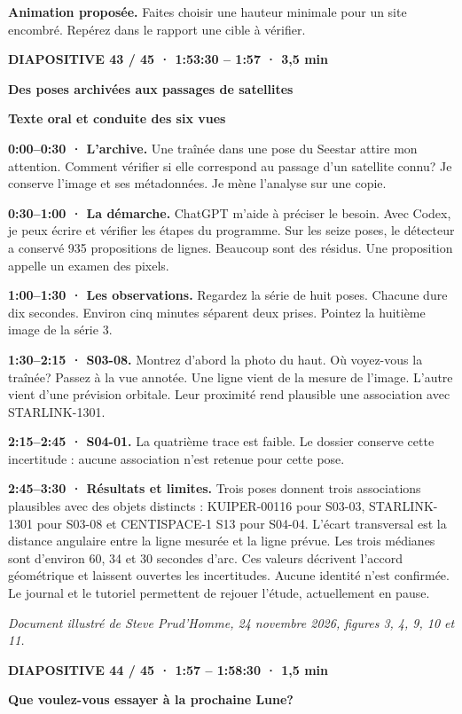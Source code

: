 \documentclass[10pt,letterpaper]{article}
\newcommand{\repere}[1]{\textcolor{accent}{\bfseries #1}\par}
\begin{document}
\smallskip\textbf{Animation proposée.} Faites choisir une hauteur minimale pour un site encombré. Repérez dans le rapport une cible à vérifier.

\clearpage\repere{DIAPOSITIVE 43 / 45 · 1:53:30 – 1:57 · 3,5 min}

{\Large\bfseries Des poses archivées aux passages de satellites\par}
\repere{Texte oral et conduite des six vues}
\textbf{0:00–0:30 · L’archive.} Une traînée dans une pose du Seestar attire mon attention. Comment vérifier si elle correspond au passage d’un satellite connu? Je conserve l’image et ses métadonnées. Je mène l’analyse sur une copie.

\textbf{0:30–1:00 · La démarche.} ChatGPT m’aide à préciser le besoin. Avec Codex, je peux écrire et vérifier les étapes du programme. Sur les seize poses, le détecteur a conservé 935 propositions de lignes. Beaucoup sont des résidus. Une proposition appelle un examen des pixels.

\textbf{1:00–1:30 · Les observations.} Regardez la série de huit poses. Chacune dure dix secondes. Environ cinq minutes séparent deux prises. Pointez la huitième image de la série 3.

\textbf{1:30–2:15 · S03-08.} Montrez d’abord la photo du haut. Où voyez-vous la traînée? Passez à la vue annotée. Une ligne vient de la mesure de l’image. L’autre vient d’une prévision orbitale. Leur proximité rend plausible une association avec STARLINK-1301.

\textbf{2:15–2:45 · S04-01.} La quatrième trace est faible. Le dossier conserve cette incertitude : aucune association n’est retenue pour cette pose.

\textbf{2:45–3:30 · Résultats et limites.} Trois poses donnent trois associations plausibles avec des objets distincts : KUIPER-00116 pour S03-03, STARLINK-1301 pour S03-08 et CENTISPACE-1 S13 pour S04-04. L’écart transversal est la distance angulaire entre la ligne mesurée et la ligne prévue. Les trois médianes sont d’environ 60, 34 et 30 secondes d’arc. Ces valeurs décrivent l’accord géométrique et laissent ouvertes les incertitudes. Aucune identité n’est confirmée. Le journal et le tutoriel permettent de rejouer l’étude, actuellement en pause.

\textit{Document illustré de Steve Prud’Homme, 24 novembre 2026, figures 3, 4, 9, 10 et 11.}

\clearpage\repere{DIAPOSITIVE 44 / 45 · 1:57 – 1:58:30 · 1,5 min}

{\Large\bfseries Que voulez-vous essayer à la prochaine Lune?\par}
\end{document}
